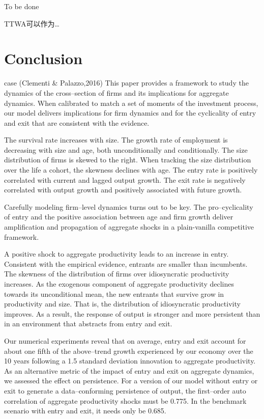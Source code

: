 \documentclass[
  12pt,
  oneside]{book}
\begin{document}
To be done

TTWA可以作为\ldots{}

\hypertarget{conclusion}{%
\chapter{Conclusion}\label{conclusion}}

case (Clementi \& Palazzo,2016)
This paper provides a framework to study the dynamics of the cross--section of firms and its implications for aggregate dynamics. When calibrated to match a set of moments of the investment process, our model delivers implications for firm dynamics and for the cyclicality of entry and exit that are consistent with the evidence.

The survival rate increases with size. The growth rate of employment is decreasing with size and age, both unconditionally and conditionally. The size distribution of firms is skewed to the right. When tracking the size distribution over the life a cohort, the skewness declines with age. The entry rate is positively correlated with current and lagged output growth. The exit rate is negatively correlated with output growth and positively associated with future growth.

Carefully modeling firm--level dynamics turns out to be key. The pro--cyclicality of entry and the positive association between age and firm growth deliver amplification and propagation of aggregate shocks in a plain-vanilla competitive framework.

A positive shock to aggregate productivity leads to an increase in entry. Consistent with the empirical evidence, entrants are smaller than incumbents. The skewness of the distribution of firms over idiosyncratic productivity increases. As the exogenous component of aggregate productivity declines towards its unconditional mean, the new entrants that survive grow in productivity and size. That is, the distribution of idiosyncratic productivity improves. As a result, the response of output is stronger and more persistent than in an environment that abstracts from entry and exit.

Our numerical experiments reveal that on average, entry and exit account for about one fifth of the above--trend growth experienced by our economy over the 10 years following a 1.5 standard deviation innovation to aggregate productivity. As an alternative metric of the impact of entry and exit on aggregate dynamics, we assessed the effect on persistence. For a version of our model without entry or exit to generate a data--conforming persistence of output, the first--order auto correlation of aggregate productivity shocks must be 0.775. In the benchmark scenario with entry and exit, it needs only be 0.685.
\end{document}
